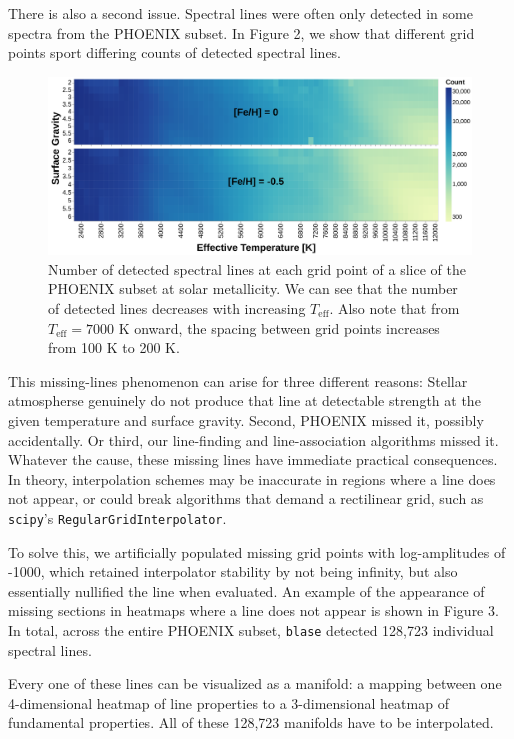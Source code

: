 \documentclass[twocolumn]{aastex631}
\begin{document}
There is also a second issue.  Spectral lines were often
only detected in some spectra from the PHOENIX subset. In Figure 2, we show
that different grid points sport differing counts of detected spectral lines.
\begin{figure}
    \centering
    \includegraphics[width=\textwidth]{figure2}
    \caption{Number of detected spectral lines at each grid point of 
    a slice of the PHOENIX subset at solar metallicity. We can see that
    the number of detected lines decreases with increasing $T_{\mathrm{eff}}$.
    Also note that from $T_{\mathrm{eff}} = 7000$ K onward, the spacing 
    between grid points increases from 100 K to 200 K.}
\end{figure}

This missing-lines phenomenon can arise for three different reasons: Stellar atmospherse genuinely do not produce that line at detectable strength at the given temperature and surface gravity. Second, PHOENIX missed it, possibly accidentally.  Or third, our line-finding and line-association algorithms missed it.  Whatever the cause, these missing lines have immediate practical consequences.  In theory, interpolation schemes may be inaccurate in regions where 
a line does not appear, or could break algorithms that demand a rectilinear grid, such as \texttt{scipy}'s \texttt{RegularGridInterpolator}.

To solve this, we artificially
populated missing grid points with log-amplitudes of -1000, which retained
interpolator stability by not being infinity, but also essentially 
nullified the line when evaluated. An example of the appearance of missing 
sections in heatmaps where a line does not appear is shown in Figure 3. 
In total, across the entire PHOENIX subset, \texttt{blase} detected 
128,723 individual spectral lines.  

Every one of these lines can be visualized as a manifold: a mapping between one 4-dimensional heatmap of line properties to a 3-dimensional heatmap of fundamental properties. All of these 128,723 manifolds have to be interpolated.
\end{document}
